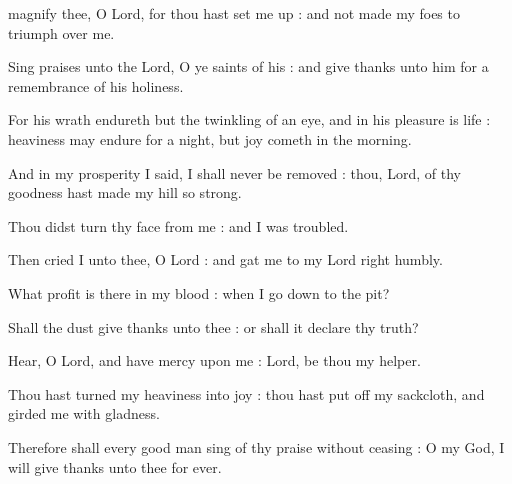  magnify thee, O Lord, for thou hast set me up : and not made my foes to triumph over me.\par
{}
Sing praises unto the Lord, O ye saints of his : and give thanks unto him for a remembrance of his holiness.\par
{}For his wrath endureth but the twinkling of an eye, and in his pleasure is life : heaviness may endure for a night, but joy cometh in the morning.\par
{}And in my prosperity I said, I shall never be removed : thou, Lord, of thy goodness hast made my hill so strong.\par
{}Thou didst turn thy face from me : and I was troubled.\par
{}Then cried I unto thee, O Lord : and gat me to my Lord right humbly.\par
{}What profit is there in my blood : when I go down to the pit?\par
{}Shall the dust give thanks unto thee : or shall it declare thy truth?\par
{}Hear, O Lord, and have mercy upon me : Lord, be thou my helper.\par
{}Thou hast turned my heaviness into joy : thou hast put off my sackcloth, and girded me with gladness.\par
{}Therefore shall every good man sing of thy praise without ceasing : O my God, I will give thanks unto thee for ever.\par


